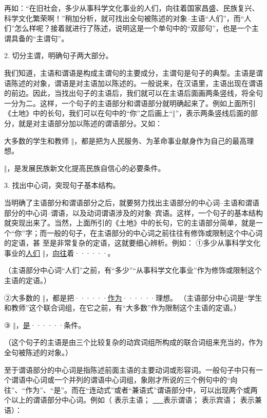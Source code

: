再如：“在旧社会，多少从事科学文化事业的人们，向往着国家昌盛、民族复兴、科学文化繁荣啊！”稍加分析，就可找出全句被陈述的对象--主语“人们”，而“人们”怎么样呢？接着就进行了陈述，说明这是一个单句中的“双部句”，也是一个主谓具备的“主谓句”。

2. 切分主谓，明确句子两大部分。

我们知道，主语和谓语是构成主谓句的主要成分，主谓句是句子的典型。主语是谓语陈述的对象，谓语是对主语加以陈述的。一般说来，在汉语里，主语出现在谓语的前边。因此，当找出句子的主语后，我们就可以在主语后面画两条竖线，将全句一分为二。这样，一个句子的主语部分和谓语部分就明确起来了。例如上面所引《土地》中的长句，我们可以在句中的“你”之后画上“$\Vert$”，表示两条竖线后面的部分，就是对主语部分加以陈述的谓语部分。又如：

大多数的学生和教师 $\Vert$，都是把为人民服务、为革命事业献身作为自己的最高理想。

 $\Vert$，是发展民族新文化提高民族自信心的必要条件。

3. 找出中心词，突现句子基本结构。

当明确了主语部分和谓语部分之后，就要努力找出主语部分的中心词--主语和谓语部分的中心词--谓语，以及动词谓语涉及的对象--宾语。这样，一个句子的基本结构就突现出来了。当然，上面所引的《土地》中的长句，它的主语部分简单，就是一个“你”字；而一般的句子，在主语部分的中心词之前往往有修饰或限制这个中心词的定语，甚
至是非常复杂的定语，这就要细心辨析。例如：
\newpage
①多少从事科学文化事业的\uline{人们} $\Vert$，\uline{向往}着······。

（主语部分中心词“人们”之前，有“多少”“从事科学文化事业”作为修饰或限制这个主语的定语。）

②大多数的 $\Vert$，都是把······\uline{作为}······理想。
（主语部分中心词是“学生和教师”这个联合词组，在它之前，有“大多数”作为限制这个主语的定语。）

③ $\Vert$，\uline{是}······条件。

（这个句子的主语是由三个比较复杂的动宾词组所构成的联合词组来充当的，作为全句被陈述的对象。）

至于谓语部分的中心词是指陈述前面主语的主要动词或形容词。一般句子中只有一个谓语中心词或一个并列的谓语中心词组，象刚才所说的三个例句中的“向往”、“作为”、“是”。而在“连动式”或者“兼语式”谓语部分中，可以出现两个或两个以上的谓语部分中心词。例如（
\uuline{\ \ \ }表示主语；
\uline{\ \ \ }表示谓语；
\uwave{\ \ \ }表示宾语；
表示兼语）：

